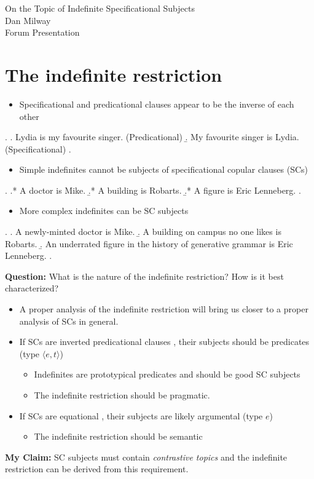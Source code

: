 \documentclass[letterpaper]{article}
\begin{document}
\begin{center}
  {\Large On the Topic of Indefinite Specificational Subjects\\}
  {\large Dan Milway}\\
  Forum Presentation
\end{center}
\section{The indefinite restriction}
\begin{itemize}
  \item Specificational and predicational clauses appear to be the inverse of each other
\end{itemize}
\ex.
\a. Lydia is my favourite singer. (Predicational)
\b. My favourite singer is Lydia. (Specificational)
\z.

\begin{itemize}
  \item Simple indefinites cannot be subjects of specificational copular clauses (SCs)
\end{itemize}
\ex.\label{ex:BadSCs}
\a.* A doctor is Mike.
\b.* A building is Robarts.
\b.* A figure is Eric Lenneberg.
\z.

\begin{itemize}
  \item More complex indefinites can be SC subjects
\end{itemize}
\ex.\label{ex:GoodSCs}
\a. A newly-minted doctor is Mike.
\b. A building on campus no one likes is Robarts.
\b. An underrated figure in the history of generative grammar is Eric Lenneberg.
\z.

\textbf{Question:} What is the nature of the indefinite restriction? How is it best characterized?
\begin{itemize}
  \item A proper analysis of the indefinite restriction will bring us closer to a proper analysis of SCs in general.
  \item If SCs are inverted predicational clauses \parencite{moro1997raising,mikkelsen2004specifying}, their subjects should be predicates (type $\langle e,t\rangle$)
    \begin{itemize}
      \item Indefinites are prototypical predicates and should be good SC subjects
      \item The indefinite restriction should be pragmatic.
    \end{itemize}
  \item If SCs are equational \parencite{heycockkroch1999pseudocleft,heycock2012specification}, their subjects are likely argumental (type $e$)
    \begin{itemize}
      \item The indefinite restriction should be semantic
    \end{itemize}
\end{itemize}
\textbf{My Claim:} SC subjects must contain \textit{contrastive topics} and the indefinite restriction can be derived from this requirement.
\end{document}
